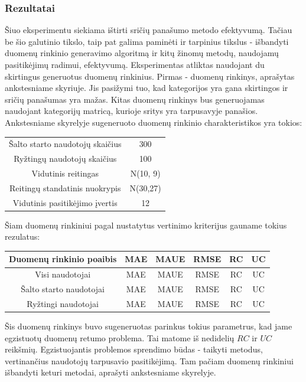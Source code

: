 \documentclass{VUMIFInfMagistrinis}
\begin{document}
\subsubsection{Rezultatai}
Šiuo eksperimentu siekiama ištirti sričių panašumo metodo efektyvumą. Tačiau be šio galutinio tikslo, taip pat galima paminėti ir tarpinius tikslus - išbandyti duomenų rinkinio generavimo algoritmą ir kitų žinomų metodų, naudojamų pasitikėjimų radimui, efektyvumą.
\newline
\indent
Eksperimentas atliktas naudojant du skirtingus generuotus duomenų rinkinius. Pirmas - duomenų rinkinys, aprašytas ankstesniame skyriuje. Jis pasižymi tuo, kad kategorijos yra gana skirtingos ir sričių panašumas yra mažas. Kitas duomenų rinkinys bus generuojamas naudojant kategorijų matricą, kurioje sritys yra tarpusavyje panašios. 
Ankstesniame skyrelyje sugeneruoto duomenų rinkinio charakteristikos yra tokios:
\begin{center}
	\begin{tabular}{||c c||} 
		Šalto starto naudotojų skaičius & 300 \\
		Ryžtingų naudotojų skaičius  & 100 \\
		Vidutinis reitingas &  N(10, 9) \\
		Reitingų standatinis nuokrypis & N(30,27) \\
		Vidutinis pasitikėjimo įvertis & 12 \\
	\end{tabular}
\end{center}
\indent
Šiam duomenų rinkiniui pagal nustatytus vertinimo kriterijus gauname tokius rezulatus:
\begin{center}
	\begin{tabular}{||c c c c c c ||} 
		Duomenų rinkinio poaibis & MAE & MAUE & RMSE & RC & UC \\
		\hline
		Visi naudotojai & MAE & MAUE & RMSE & RC & UC \\
		\hline
		Šalto starto naudotojai & MAE & MAUE & RMSE & RC & UC \\
		\hline
		Ryžtingi naudotojai & MAE & MAUE & RMSE & RC & UC \\
	\end{tabular}
\end{center}
\indent
Šis duomenų rinkinys buvo sugeneruotas parinkus tokius parametrus, kad jame egzistuotų duomenų retumo problema. Tai matome iš nedidelių $RC$ ir $UC$ reikšmių. Egzistuojantis problemos sprendimo būdas - taikyti metodus, vertinančius naudotojų tarpusavio pasitikėjimą. Tam pačiam duomenų rinkiniui išbandyti keturi metodai, aprašyti ankstesniame skyrelyje. 
\end{document}
